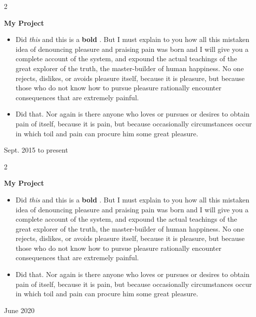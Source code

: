 \documentclass[10pt, letterpaper]{article}
\newenvironment{highlights}{
    \begin{itemize}[
        topsep=0.10 cm,
        parsep=0.10 cm,
        partopsep=0pt,
        itemsep=0pt,
        leftmargin=0.4 cm + 10pt
    ]
}{
    \end{itemize}
} %
\newenvironment{twocolentry}[2][]{
    \onecolentry
    \def\secondColumn{#2}
    \setcolumnwidth{\fill, 4.5 cm}
    \begin{paracol}{2}
}{
    \switchcolumn \raggedleft \secondColumn
    \end{paracol}
    \endonecolentry
} %
\let\hrefWithoutArrow\href
\renewcommand{\href}[2]{\hrefWithoutArrow{#1}{\mbox{\ifthenelse{\equal{#2}{}}{ }{#2 }\raisebox{.15ex}{\footnotesize \faExternalLink*}}}}
\begin{document}
        \begin{twocolentry}{
            Sept. 2015 to present
        }
            \textbf{My Project}
            \begin{highlights}
                \item Did \textit{this} and this is a \textbf{bold} \href{https://example.com}{link}. But I must explain to you how all this mistaken idea of denouncing pleasure and praising pain was born and I will give you a complete account of the system, and expound the actual teachings of the great explorer of the truth, the master-builder of human happiness. No one rejects, dislikes, or avoids pleasure itself, because it is pleasure, but because those who do not know how to pursue pleasure rationally encounter consequences that are extremely painful.
                \item Did that. Nor again is there anyone who loves or pursues or desires to obtain pain of itself, because it is pain, but because occasionally circumstances occur in which toil and pain can procure him some great pleasure.
            \end{highlights}
        \end{twocolentry}


        \vspace{0.2 cm}

        \begin{twocolentry}{
            June 2020
        }
            \textbf{My Project}
            \begin{highlights}
                \item Did \textit{this} and this is a \textbf{bold} \href{https://example.com}{link}. But I must explain to you how all this mistaken idea of denouncing pleasure and praising pain was born and I will give you a complete account of the system, and expound the actual teachings of the great explorer of the truth, the master-builder of human happiness. No one rejects, dislikes, or avoids pleasure itself, because it is pleasure, but because those who do not know how to pursue pleasure rationally encounter consequences that are extremely painful.
                \item Did that. Nor again is there anyone who loves or pursues or desires to obtain pain of itself, because it is pain, but because occasionally circumstances occur in which toil and pain can procure him some great pleasure.
            \end{highlights}
        \end{twocolentry}
\end{document}
